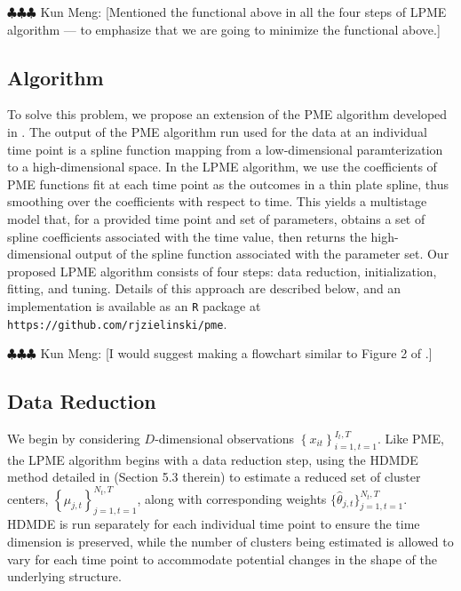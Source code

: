\documentclass[11pt,reqno]{article}
\newcommand{\commentout}[1]{}
\newcommand{\meng}[1]{{\color{purple} \sf $\clubsuit\clubsuit\clubsuit$ Kun Meng: [#1]}}
\theoremstyle{definition}
\begin{document}
\meng{Mentioned the functional above in all the four steps of LPME algorithm --- to emphasize that we are going to minimize the functional above.}

\commentout{Note that we assume changes over time to be smooth. Therefore, we seek a function $f^{*}$ that minimizes $\mathcal{D}_X(f^{*})$ while penalizing both the roughness of the function over the time-independent shape and the changes in the function over time, expressed as }

\subsection{Algorithm}

To solve this problem, we propose an extension of the PME algorithm developed in \cite{mengPrincipalManifoldEstimation2021}. The output of the PME algorithm run used for the data at an individual time point is a spline function mapping from a low-dimensional paramterization to a high-dimensional space. In the LPME algorithm, we use the coefficients of PME functions fit at each time point as the outcomes in a thin plate spline, thus smoothing over the coefficients with respect to time. This yields a multistage model that, for a provided time point and set of parameters, obtains a set of spline coefficients associated with the time value, then returns the high-dimensional output of the spline function associated with the parameter set. Our proposed LPME algorithm consists of four steps: data reduction, initialization, fitting, and tuning. Details of this approach are described below, and an implementation is available as an \texttt{R} package at \texttt{https://github.com/rjzielinski/pme}.

\meng{I would suggest making a flowchart similar to Figure 2 of \cite{mengPrincipalManifoldEstimation2021}.}

\subsection*{Data Reduction}
We begin by considering $D$-dimensional observations $\left\{x_{it}\right\}_{i=1, t=1}^{I_t, T}$. Like PME, the LPME algorithm begins with a data reduction step, using the HDMDE method detailed in \cite{mengPrincipalManifoldEstimation2021} (Section 5.3 therein) to estimate a reduced set of cluster centers, $\left\{\mu_{j, t}\right\}_{j=1, t=1}^{N_t, T}$, along with corresponding weights $\{\hat{\theta}_{j, t}\}_{j=1, t=1}^{N_t, T}$. HDMDE is run separately for each individual time point to ensure the time dimension is preserved, while the number of clusters being estimated is allowed to vary for each time point to accommodate potential changes in the shape of the underlying structure. 
\end{document}
